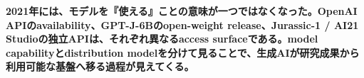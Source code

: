 \noindent\textbf{2021年には、モデルを『使える』ことの意味が一つではなくなった。OpenAI APIのavailability、GPT-J-6Bのopen-weight release、Jurassic-1 / AI21 Studioの独立APIは、それぞれ異なるaccess surfaceである。model capabilityとdistribution modelを分けて見ることで、生成AIが研究成果から利用可能な基盤へ移る過程が見えてくる。}\autocite{src-1b063a3564f3,src-b50beb89f16f,src-bf581c89a17f}
